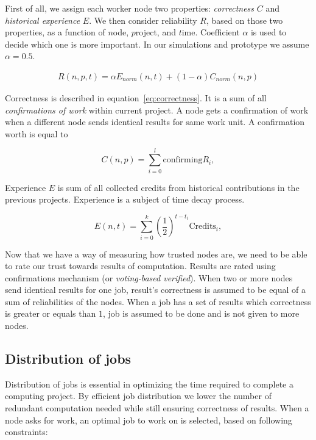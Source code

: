 First of all, we assign each worker node two properties: \emph{correctness} $C$ and \emph{historical experience} $E$. We then consider reliability $R$, based on those two properties, as a function of $n$ode, $p$roject, and $t$ime. Coefficient $\alpha$ is used to decide which one is more important. In our simulations and prototype we assume $\alpha = 0.5$.

\begin{align} \label{eqn:R}
R(n, p, t) = \alpha {E}_{norm}(n,t) + (1-\alpha)  C_{norm}(n, p)  \nonumber
\end{align}

Correctness is described in equation~\ref{eq:correctness}. It is a sum of all \emph{confirmations of work} within current project. A node gets a confirmation of work when a different node sends identical results for same work unit. A confirmation worth is equal to 

\begin{equation} \label{eq:correctness}
C(n, p) = \sum_{i=0}^{l} \text{confirming} R_i,
\end{equation}

Experience $E$ is sum of all collected credits from historical contributions in the previous projects. 
Experience is a subject of time decay process.

\begin{equation}
E(n,t) = \sum_{i=0}^{k} (\frac{1}{2})^{t-t_i} \text{Credits}_i,
\end{equation}

Now that we have a way of measuring how trusted nodes are, we need to be able to rate our trust towards results of computation. Results are rated using confirmations mechanism (or \emph{voting-based verified}\cite{bendahmane2012result}). When two or more nodes send identical results for one job, result's correctness is assumed to be equal of a sum of reliabilities of the nodes. When a job has a set of results which correctness is greater or equals than $1$, job is assumed to be done and is not given to more nodes.

\subsection{Distribution of jobs}
\label{s:jobdist}

Distribution of jobs is essential in optimizing the time required to complete a computing project. By efficient job distribution we lower the number of redundant computation needed while still ensuring correctness of results. When a node asks for work, an optimal job to work on is selected, based on following constraints:

